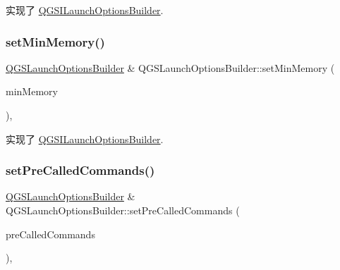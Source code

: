 实现了 \mbox{\hyperlink{class_q_g_s_i_launch_options_builder_ad3e1730239e588aa35bfa6d7f0a761bd}{Q\+G\+S\+I\+Launch\+Options\+Builder}}.

\mbox{\label{class_q_g_s_launch_options_builder_ae99865719a1a7df01ce052be1fbfea5a}} 
\subsubsection{\texorpdfstring{set\+Min\+Memory()}{setMinMemory()}}
{\footnotesize\ttfamily \mbox{\hyperlink{class_q_g_s_launch_options_builder}{Q\+G\+S\+Launch\+Options\+Builder}} \& Q\+G\+S\+Launch\+Options\+Builder\+::set\+Min\+Memory (\begin{DoxyParamCaption}\item[{const int}]{min\+Memory }\end{DoxyParamCaption})\hspace{0.3cm}{\ttfamily [override]}, {\ttfamily [virtual]}}



实现了 \mbox{\hyperlink{class_q_g_s_i_launch_options_builder_a7a33701b3c4b06343071c7073285744d}{Q\+G\+S\+I\+Launch\+Options\+Builder}}.

\mbox{\label{class_q_g_s_launch_options_builder_a83840a81a87e550a9140cea27cf73af1}} 
\subsubsection{\texorpdfstring{set\+Pre\+Called\+Commands()}{setPreCalledCommands()}}
{\footnotesize\ttfamily \mbox{\hyperlink{class_q_g_s_launch_options_builder}{Q\+G\+S\+Launch\+Options\+Builder}} \& Q\+G\+S\+Launch\+Options\+Builder\+::set\+Pre\+Called\+Commands (\begin{DoxyParamCaption}\item[{const Q\+String \&}]{pre\+Called\+Commands }\end{DoxyParamCaption})\hspace{0.3cm}{\ttfamily [override]}, {\ttfamily [virtual]}}



